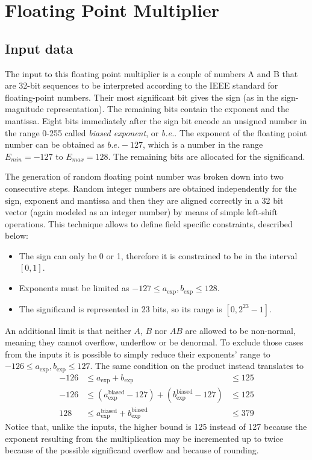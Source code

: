 \chapter{Floating Point Multiplier}

\section{Input data}
The input to this floating point multiplier is a couple of numbers A and B that are 32-bit sequences to be interpreted according to the IEEE standard for floating-point numbers. Their most significant bit gives the sign (as in the sign-magnitude representation). The remaining bits contain the exponent and the mantissa. Eight bits immediately after the sign bit encode an unsigned number in the range 0-255 called \textit{biased exponent}, or \textit{b.e.}. The exponent of the floating point number can be obtained as $\textit{b.e.} - 127$, which is a number in the range $E_{min} = -127$ to $E_{max}=128$.
The remaining bits are allocated for the significand.

The generation of random floating point number was broken down into two consecutive steps. Random integer numbers are obtained independently for the sign, exponent and mantissa and then they are aligned correctly in a 32 bit vector (again modeled as an integer number) by means of simple left-shift operations. This technique allows to define field specific constraints, described below:
\begin{itemize}
    \item The sign can only be 0 or 1, therefore it is constrained to be in the interval $[0,1]$.
    \item Exponents must be limited as $-127 \leq a_\text{exp}, b_\text{exp} \leq 128$.
    \item The significand is represented in 23 bits, so its range is $[0, 2^{23}-1]$.
\end{itemize}
An additional limit is that neither $A$, $B$ nor $AB$ are allowed to be non-normal, meaning they cannot overflow, underflow or be denormal. To exclude those cases from the inputs it is possible to simply reduce their exponents' range to $-126 \leq a_\text{exp}, b_\text{exp} \leq 127$. The same condition on the product instead translates to
\begin{align}
-126 &\leq  a_\text{exp}                      + b_\text{exp} &\leq 125 \nonumber\\
-126 &\leq (a_\text{exp}^\text{biased} - 127) + (b_\text{exp}^\text{biased} - 127) &\leq 125 \nonumber\\
 128 &\leq  a_\text{exp}^\text{biased}        + b_\text{exp}^\text{biased} &\leq 379 \label{eqn:constraint}
\end{align}
Notice that, unlike the inputs, the higher bound is 125 instead of 127 because the exponent resulting from the multiplication may be incremented up to twice because of the possible significand overflow and because of rounding.

